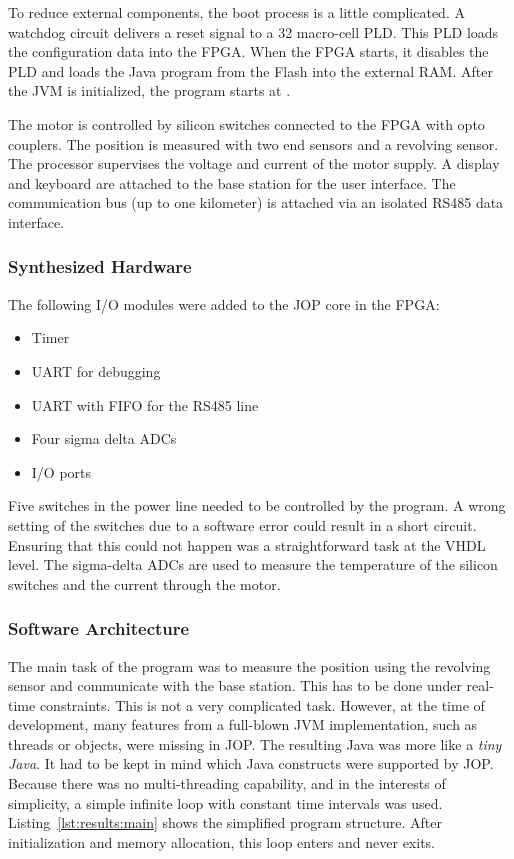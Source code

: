 To reduce external components, the boot process is a little
complicated. A watchdog circuit delivers a reset signal to a 32
macro-cell PLD. This PLD loads the configuration data into the FPGA.
When the FPGA starts, it disables the PLD and loads the Java program
from the Flash into the external RAM. After the JVM is initialized,
the program starts at .

The motor is controlled by silicon switches connected to the FPGA
with opto couplers. The position is measured with two end sensors and
a revolving sensor. The processor supervises the voltage and current
of the motor supply. A display and keyboard are attached to the base
station for the user interface. The communication bus (up to one
kilometer) is attached via an isolated RS485 data interface.

\subsubsection{Synthesized Hardware}

The following I/O modules were added to the JOP core in the FPGA:
%
\begin{itemize}
\item Timer
\item UART for debugging
\item UART with FIFO for the RS485 line
\item Four sigma delta ADCs
\item I/O ports
\end{itemize}
%
Five switches in the power line needed to be controlled by the
program. A wrong setting of the switches due to a software error
could result in a short circuit. Ensuring that this could not happen
was a straightforward task at the VHDL level. The sigma-delta ADCs
are used to measure the temperature of the silicon switches and the
current through the motor.

\subsubsection{Software Architecture}

The main task of the program was to measure the position using the
revolving sensor and communicate with the base station. This has to
be done under real-time constraints. This is not a very complicated
task. However, at the time of development, many features from a
full-blown JVM implementation, such as threads or objects, were
missing in JOP. The resulting Java was more like a \emph{tiny Java}.
It had to be kept in mind which Java constructs were supported by
JOP. Because there was no multi-threading capability, and in the
interests of simplicity, a simple infinite loop with constant time
intervals was used. Listing~\ref{lst:results:main} shows the
simplified program structure. After initialization and memory
allocation, this loop enters and never exits.

